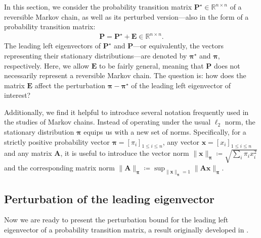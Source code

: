 In this section, we consider the probability transition matrix $\bm{P}^{\star} \in \mathbb{R}^{n\times n}$ of a reversible Markov chain, as well as its perturbed version---also in the form of a probability transition matrix:
%
\begin{align*}
	\bm{P}=\bm{P}^{\star}+\bm{E} \in \mathbb{R}^{n\times n}.
\end{align*}
%
The leading left eigenvectors of $\bm{P}^{\star}$ and $\bm{P}$---or equivalently, the vectors representing their stationary distributions---are denoted by $\bm{\pi}^{\star}$ and $\bm{\pi}$, respectively.
Here, we allow $\bm{E}$ to be fairly general, meaning that $\bm{P}$ does not necessarily represent a reversible Markov chain. The question is: how does the matrix $\bm{E}$ affect the perturbation $\bm{\pi} - \bm{\pi}^{\star}$ of the leading left eigenvector of interest?



Additionally, we find it helpful to introduce several notation frequently used in the studies of Markov chains.
Instead of operating under the usual $\ell_{2}$ norm, the stationary
distribution $\bm{\pi}$ equips us with a new set of norms.
Specifically,  for a strictly positive probability vector $\bm{\pi}=[\pi_i]_{1\leq i\leq n}$, any vector $\bm{x}=[x_i]_{1\leq i\leq n}$ and any matrix $\bm{A}$,
it is useful to introduce the vector norm $\|\bm{x}\|_{\bm{\pi}} \coloneqq \sqrt{\sum_i \pi_i x_i^2}$
and the corresponding matrix norm $\|\bm{A}\|_{\bm{\pi}} \coloneqq  \sup_{\|\bm{x}\|_{\bm{\pi}}=1}\|\bm{A}\bm{x}\|_{\bm{\pi}}$.





\subsection{Perturbation of the leading eigenvector}
\label{sec:perturbation-theory-MC}

Now we are ready to present the perturbation bound for the leading left
eigenvector of a probability transition matrix, a result originally developed in \citet{chen2017spectral}.

